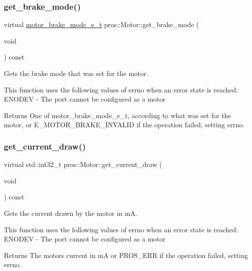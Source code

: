 \subsubsection{\texorpdfstring{get\+\_\+brake\+\_\+mode()}{get\_brake\_mode()}}
{\footnotesize\ttfamily virtual \hyperlink{motors_8h_aa324a2881696428c9e3684f9ad23a83b}{motor\+\_\+brake\+\_\+mode\+\_\+e\+\_\+t} pros\+::\+Motor\+::get\+\_\+brake\+\_\+mode (\begin{DoxyParamCaption}\item[{void}]{ }\end{DoxyParamCaption}) const\hspace{0.3cm}{\ttfamily [virtual]}}

Gets the brake mode that was set for the motor.

This function uses the following values of errno when an error state is reached\+: E\+N\+O\+D\+EV -\/ The port cannot be configured as a motor

\begin{DoxyReturn}{Returns}
One of motor\+\_\+brake\+\_\+mode\+\_\+e\+\_\+t, according to what was set for the motor, or E\+\_\+\+M\+O\+T\+O\+R\+\_\+\+B\+R\+A\+K\+E\+\_\+\+I\+N\+V\+A\+L\+ID if the operation failed, setting errno. 
\end{DoxyReturn}
\mbox{\label{classpros_1_1Motor_a502eaf3859452721e2327e53ab3f34d8}} 
\subsubsection{\texorpdfstring{get\+\_\+current\+\_\+draw()}{get\_current\_draw()}}
{\footnotesize\ttfamily virtual std\+::int32\+\_\+t pros\+::\+Motor\+::get\+\_\+current\+\_\+draw (\begin{DoxyParamCaption}\item[{void}]{ }\end{DoxyParamCaption}) const\hspace{0.3cm}{\ttfamily [virtual]}}

Gets the current drawn by the motor in mA.

This function uses the following values of errno when an error state is reached\+: E\+N\+O\+D\+EV -\/ The port cannot be configured as a motor

\begin{DoxyReturn}{Returns}
The motor\textquotesingle{}s current in mA or P\+R\+O\+S\+\_\+\+E\+RR if the operation failed, setting errno. 
\end{DoxyReturn}
\mbox{\label{classpros_1_1Motor_ad2eafcdf16ed480ddcbb80a45b19c01a}} 
